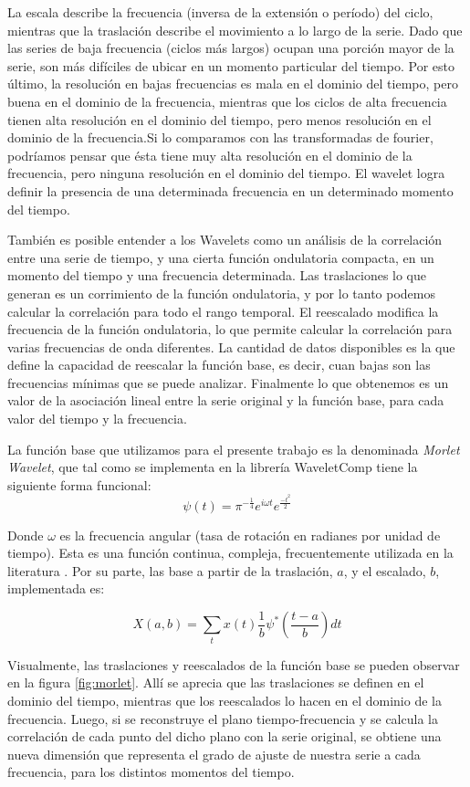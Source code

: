 \documentclass[a4paper]{article}
\begin{document}
La escala describe la frecuencia (inversa de la extensión o período) del ciclo, mientras que la traslación describe el movimiento a lo largo de la serie. Dado que las series de baja frecuencia (ciclos más largos) ocupan una porción mayor de la serie, son más difíciles de ubicar en un momento particular del tiempo. Por esto último, la resolución en bajas frecuencias es mala en el dominio del tiempo, pero buena en el dominio de la frecuencia, mientras que los ciclos de alta frecuencia tienen alta resolución en el dominio del tiempo, pero menos resolución en el dominio de la frecuencia.Si lo comparamos con las transformadas de fourier, podríamos pensar que ésta tiene muy alta resolución en el dominio de la frecuencia, pero ninguna resolución en el dominio del tiempo. El wavelet logra definir la presencia de una determinada frecuencia en un determinado momento del tiempo.
 

También es posible entender a los Wavelets como un análisis de la correlación entre una serie de tiempo, y una cierta función ondulatoria compacta, en un momento del tiempo y una frecuencia determinada. Las traslaciones lo que generan es un corrimiento de la función ondulatoria, y por lo tanto podemos calcular la correlación para todo el rango temporal. El reescalado modifica la frecuencia de la función ondulatoria, lo que permite calcular la correlación para varias frecuencias de onda diferentes. La cantidad de datos disponibles es la que define la capacidad de reescalar la función base, es decir, cuan bajas son las frecuencias mínimas que se puede analizar. Finalmente lo que obtenemos es un valor de la asociación lineal entre la serie original y la función base, para cada valor del tiempo y la frecuencia.  

La función base que utilizamos para el presente trabajo es la denominada \textit{Morlet Wavelet}, que tal como se implementa en la librería WaveletComp \citep{Roesch2018} tiene la siguiente forma funcional:
$$
\psi(t)=\pi^{-\frac{1}{4}}e^{i\omega t}e^{\frac{-t^2}{2}}
$$

Donde $\omega$ es la frecuencia angular (tasa de rotación en radianes por unidad de tiempo). Esta es una función continua, compleja, frecuentemente utilizada en la literatura \citep{conraria2011continuous}. Por su parte, las base a partir de la traslación, $a$, y el escalado, $b$, implementada es:

$$
X(a,b)=\sum_{t} x(t)   \frac{1}{b} \psi^*\left(\frac{t-a}{b}\right)dt
$$

Visualmente, las traslaciones y reescalados de la función base se pueden observar en la figura \ref{fig:morlet}. Allí se aprecia que las traslaciones se definen en el dominio del tiempo, mientras que los reescalados lo hacen en el dominio de la frecuencia. Luego, si se reconstruye el plano tiempo-frecuencia y se calcula la correlación de cada punto del dicho plano con la serie original, se obtiene una nueva dimensión que representa el grado de ajuste de nuestra serie a cada frecuencia, para los distintos momentos del tiempo. 
\end{document}
